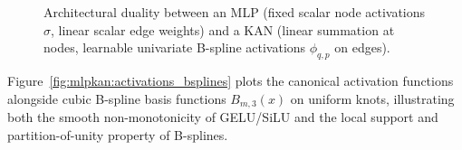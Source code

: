 \documentclass[../../../../master.tex]{subfiles}
\begin{document}
\begin{figure}[htbp]
  \caption{Architectural duality between an MLP (fixed scalar node activations $\sigma$, linear scalar edge weights) and a KAN (linear summation at nodes, learnable univariate B-spline activations $\phi_{q,p}$ on edges).}
  \label{fig:mlpkan:mlp_vs_kan_tikz}
\end{figure}

Figure~\ref{fig:mlpkan:activations_bsplines} plots the canonical activation functions alongside cubic B-spline basis functions $B_{m,3}(x)$ on uniform knots, illustrating both the smooth non-monotonicity of GELU/SiLU and the local support and partition-of-unity property of B-splines.
\end{document}
